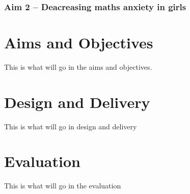 \documentclass[11pt, a4paper, notitlepage]{article}
\begin{document}
\subsubsection{Aim 2 -- Deacreasing maths anxiety in girls}

\section{Aims and Objectives}
This is what will go in the aims and objectives.

\section{Design and Delivery}

This is what will go in design and delivery

\section{Evaluation}
This is what will go in the evaluation



\end{document}
